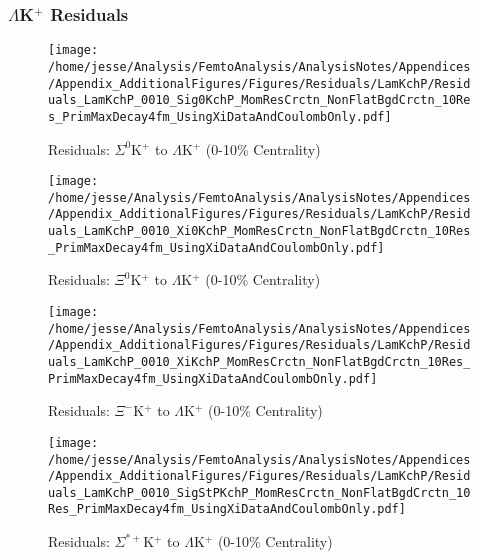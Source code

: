 \documentclass[/home/jesse/Analysis/FemtoAnalysis/AnalysisNotes/AnalysisNoteJBuxton.tex]{subfiles}
\begin{document}
\subsubsection{\texorpdfstring{$\Lambda$K$^{+}$}{TEXT} Residuals}
\label{Residuals_LamKchP}

\begin{figure}[h]
  \centering
  \texttt{[image: /home/jesse/Analysis/FemtoAnalysis/AnalysisNotes/Appendices/Appendix\_AdditionalFigures/Figures/Residuals/LamKchP/Residuals\_LamKchP\_0010\_Sig0KchP\_MomResCrctn\_NonFlatBgdCrctn\_10Res\_PrimMaxDecay4fm\_UsingXiDataAndCoulombOnly.pdf]}
  \caption[Residuals: $\Sigma^{0}$K$^{+}$ to $\Lambda$K$^{+}$ (0-10\% Centrality)]{Residuals: $\Sigma^{0}$K$^{+}$ to $\Lambda$K$^{+}$ (0-10\% Centrality)}
  \label{fig:Res_LamKchP_0010_Sig0KchP}
\end{figure}


\begin{figure}[h]
  \centering
  \texttt{[image: /home/jesse/Analysis/FemtoAnalysis/AnalysisNotes/Appendices/Appendix\_AdditionalFigures/Figures/Residuals/LamKchP/Residuals\_LamKchP\_0010\_Xi0KchP\_MomResCrctn\_NonFlatBgdCrctn\_10Res\_PrimMaxDecay4fm\_UsingXiDataAndCoulombOnly.pdf]}
  \caption[Residuals: $\Xi^{0}$K$^{+}$ to $\Lambda$K$^{+}$ (0-10\% Centrality)]{Residuals: $\Xi^{0}$K$^{+}$ to $\Lambda$K$^{+}$ (0-10\% Centrality)}
  \label{fig:Res_LamKchP_0010_Xi0KchP}
\end{figure}


\begin{figure}[h]
  \centering
  \texttt{[image: /home/jesse/Analysis/FemtoAnalysis/AnalysisNotes/Appendices/Appendix\_AdditionalFigures/Figures/Residuals/LamKchP/Residuals\_LamKchP\_0010\_XiKchP\_MomResCrctn\_NonFlatBgdCrctn\_10Res\_PrimMaxDecay4fm\_UsingXiDataAndCoulombOnly.pdf]}
  \caption[Residuals: $\Xi^{-}$K$^{+}$ to $\Lambda$K$^{+}$ (0-10\% Centrality)]{Residuals: $\Xi^{-}$K$^{+}$ to $\Lambda$K$^{+}$ (0-10\% Centrality)}
  \label{fig:Res_LamKchP_0010_XiCKchP}
\end{figure}


\begin{figure}[h]
  \centering
  \texttt{[image: /home/jesse/Analysis/FemtoAnalysis/AnalysisNotes/Appendices/Appendix\_AdditionalFigures/Figures/Residuals/LamKchP/Residuals\_LamKchP\_0010\_SigStPKchP\_MomResCrctn\_NonFlatBgdCrctn\_10Res\_PrimMaxDecay4fm\_UsingXiDataAndCoulombOnly.pdf]}
  \caption[Residuals: $\Sigma^{*+}$K$^{+}$ to $\Lambda$K$^{+}$ (0-10\% Centrality)]{Residuals: $\Sigma^{*+}$K$^{+}$ to $\Lambda$K$^{+}$ (0-10\% Centrality)}
  \label{fig:Res_LamKchP_0010_SigStPKchP}
\end{figure}
\end{document}
